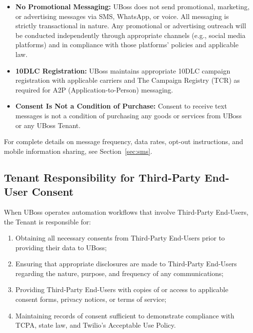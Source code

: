\documentclass[11pt, letterpaper]{article}
\begin{document}
\begin{itemize}
    \item \textbf{No Promotional Messaging:} UBoss does not send promotional, marketing,
          or advertising messages via SMS, WhatsApp, or voice. All messaging is strictly
          transactional in nature. Any promotional or advertising outreach will be
          conducted independently through appropriate channels (e.g., social media
          platforms) and in compliance with those platforms' policies and applicable law.

    \item \textbf{10DLC Registration:} UBoss maintains appropriate 10DLC campaign
          registration with applicable carriers and The Campaign Registry (TCR) as
          required for A2P (Application-to-Person) messaging.

    \item \textbf{Consent Is Not a Condition of Purchase:} Consent to receive text
          messages is not a condition of purchasing any goods or services from UBoss
          or any UBoss Tenant.
\end{itemize}

For complete details on message frequency, data rates, opt-out instructions, and
mobile information sharing, see Section~\ref{sec:sms}.

\subsection{Tenant Responsibility for Third-Party End-User Consent}

When UBoss operates automation workflows that involve Third-Party End-Users, the
Tenant is responsible for:

\begin{enumerate}
    \item Obtaining all necessary consents from Third-Party End-Users prior to providing
          their data to UBoss;
    \item Ensuring that appropriate disclosures are made to Third-Party End-Users
          regarding the nature, purpose, and frequency of any communications;
    \item Providing Third-Party End-Users with copies of or access to applicable consent
          forms, privacy notices, or terms of service;
    \item Maintaining records of consent sufficient to demonstrate compliance with TCPA,
          state law, and Twilio's Acceptable Use Policy.
\end{enumerate}
\end{document}

